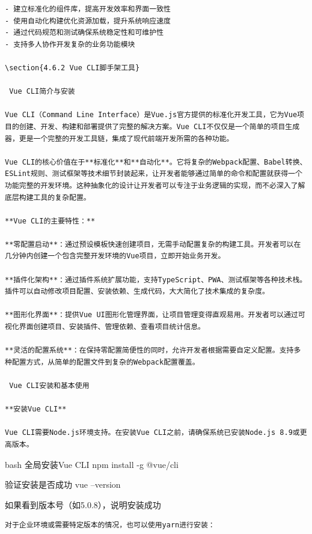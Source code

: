 {{\begin{lstlisting}
- 建立标准化的组件库，提高开发效率和界面一致性
- 使用自动化构建优化资源加载，提升系统响应速度
- 通过代码规范和测试确保系统稳定性和可维护性
- 支持多人协作开发复杂的业务功能模块

\section{4.6.2 Vue CLI脚手架工具}

 Vue CLI简介与安装

Vue CLI（Command Line Interface）是Vue.js官方提供的标准化开发工具，它为Vue项目的创建、开发、构建和部署提供了完整的解决方案。Vue CLI不仅仅是一个简单的项目生成器，更是一个完整的开发工具链，集成了现代前端开发所需的各种功能。

Vue CLI的核心价值在于**标准化**和**自动化**。它将复杂的Webpack配置、Babel转换、ESLint规则、测试框架等技术细节封装起来，让开发者能够通过简单的命令和配置就获得一个功能完整的开发环境。这种抽象化的设计让开发者可以专注于业务逻辑的实现，而不必深入了解底层构建工具的复杂配置。

**Vue CLI的主要特性：**

**零配置启动**：通过预设模板快速创建项目，无需手动配置复杂的构建工具。开发者可以在几分钟内创建一个包含完整开发环境的Vue项目，立即开始业务开发。

**插件化架构**：通过插件系统扩展功能，支持TypeScript、PWA、测试框架等各种技术栈。插件可以自动修改项目配置、安装依赖、生成代码，大大简化了技术集成的复杂度。

**图形化界面**：提供Vue UI图形化管理界面，让项目管理变得直观易用。开发者可以通过可视化界面创建项目、安装插件、管理依赖、查看项目统计信息。

**灵活的配置系统**：在保持零配置简便性的同时，允许开发者根据需要自定义配置。支持多种配置方式，从简单的配置文件到复杂的Webpack配置覆盖。

 Vue CLI安装和基本使用

**安装Vue CLI**

Vue CLI需要Node.js环境支持。在安装Vue CLI之前，请确保系统已安装Node.js 8.9或更高版本。
\end{lstlisting}

bash  全局安装Vue CLI npm install -g @vue/cli

 验证安装是否成功 vue --version

 如果看到版本号（如5.0.8），说明安装成功

\begin{lstlisting}
对于企业环境或需要特定版本的情况，也可以使用yarn进行安装：
\end{lstlisting}

}}
